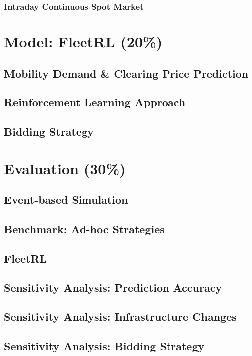 \documentclass[12pt, article]{article}
\begin{document}
\subsubsection{Intraday Continuous Spot Market}
\label{sec:org52111d3}

\section{Model: FleetRL (20\%)}
\label{sec:org34b4336}
\subsection{Mobility Demand \& Clearing Price Prediction}
\label{sec:orgfa88958}
\subsection{Reinforcement Learning Approach}
\label{sec:orgd5c1872}
\subsection{Bidding Strategy}
\label{sec:org5db0a5d}

\section{Evaluation (30\%)}
\label{sec:org705932f}
\subsection{Event-based Simulation}
\label{sec:orgdae7f2d}
\subsection{Benchmark: Ad-hoc Strategies}
\label{sec:org30a622d}
\subsection{FleetRL}
\label{sec:org197d7f0}
\subsection{Sensitivity Analysis: Prediction Accuracy}
\label{sec:org643445a}
\subsection{Sensitivity Analysis: Infrastructure Changes}
\label{sec:orgbfbe0bf}
\subsection{Sensitivity Analysis: Bidding Strategy}
\label{sec:org18e4348}
\end{document}
